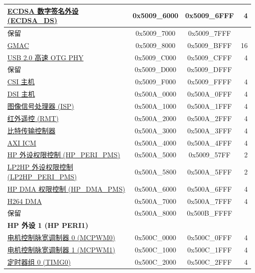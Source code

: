 \begin{ThreePartTable}
\begin{longtable}[c]{ |p{7cm}|c|c|r| }
\hyperref[mod:ecdsa]{ECDSA 数字签名外设 (ECDSA\_DS)}                    & 0x5009\_6000 & 0x5009\_6FFF &   4\\\hline
\rowcolor{gray!25}  保留                   & 0x5009\_7000 & 0x5009\_7FFF &   \\\hline
\hyperref[mod:ethernetmac]{GMAC}               & 0x5009\_8000 & 0x5009\_BFFF &   16\\\hline
\hyperref[mod:usbotghs]{USB 2.0 高速 OTG PHY}               & 0x5009\_C000 & 0x5009\_CFFF &   4\\\hline
\rowcolor{gray!25}  保留                   & 0x5009\_D000 & 0x5009\_DFFF &   \\\hline
\hyperref[mod:mipicsi]{CSI 主机}              & 0x5009\_F000 & 0x5009\_FFFF &   4\\\hline
\hyperref[mod:mipidsi]{DSI 主机}              & 0x500A\_0000 & 0x500A\_0FFF &   4\\\hline
\hyperref[mod:isp]{图像信号处理器 (ISP)}                   & 0x500A\_1000 & 0x500A\_1FFF &   4\\\hline
\hyperref[mod:rmt]{红外遥控 (RMT)}                   & 0x500A\_2000 & 0x500A\_2FFF &   4\\\hline
\hyperref[mod:bitscrm]{比特传输控制器}         & 0x500A\_3000 & 0x500A\_3FFF &   4\\\hline
\hyperref[mod:sysreg]{AXI ICM}               & 0x500A\_4000 & 0x500A\_4FFF &   4\\\hline
\hyperref[mod:permctrl]{HP 外设权限控制 (HP\_PERI\_PMS)}     & 0x500A\_5000 & 0x5009\_57FF &   2\\\hline
\hyperref[mod:permctrl]{LP2HP 外设权限控制 (LP2HP\_PERI\_PMS)} & 0x500A\_5800 & 0x500A\_5FFF &   2\\\hline
\hyperref[mod:permctrl]{HP DMA 权限控制 (HP\_DMA\_PMS)}        & 0x500A\_6000 & 0x500A\_6FFF &   4\\\hline
\hyperref[mod:h264enc]{H264 DMA}            & 0x500A\_7000 & 0x500A\_7FFF &   4\\\hline
\rowcolor{gray!25}  保留                   & 0x500A\_8000 & 0x500B\_FFFF &   \\\hline
\multicolumn{4}{|l|}{\textbf{HP 外设 1 (HP PERI1)}} \\ \hline
\hyperref[mod:mcpwm]{电机控制脉宽调制器 0 (MCPWM0)} & 0x500C\_0000 & 0x500C\_0FFF &   4 \\\hline
\hyperref[mod:mcpwm]{电机控制脉宽调制器 1 (MCPWM1)} & 0x500C\_1000 & 0x500C\_1FFF &   4 \\\hline
\hyperref[mod:timg]{定时器组 0 (TIMG0)}        & 0x500C\_2000 & 0x500C\_2FFF &   4 \\\hline

\end{longtable}
\end{ThreePartTable}
